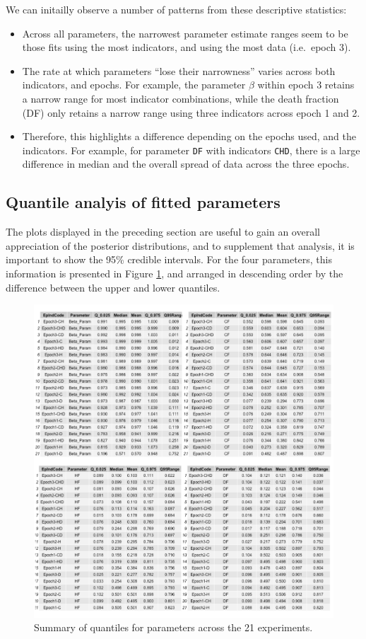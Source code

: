 \documentclass[10pt,letterpaper]{article}
\begin{document}
We can initailly observe a number of patterns from these descriptive statistics:

\begin{itemize}
\item
  Across all parameters, the narrowest parameter estimate ranges seem to be those fits using the most indicators, and using the most data (i.e.~epoch 3).
\item
  The rate at which parameters ``lose their narrowness'' varies across both indicators, and epochs. For example, the parameter \(\beta\) within epoch 3 retains a narrow range for most indicator combinations, while the death fraction (DF) only retains a narrow range using three indicators across epoch 1 and 2.
\item
  Therefore, this highlights a difference depending on the epochs used, and the indicators. For example, for parameter \texttt{DF} with indicators \texttt{CHD}, there is a large difference in median and the overall spread of data across the three epochs.
\end{itemize}

\hypertarget{quantile-analyis-of-fitted-parameters}{%
\subsection{Quantile analyis of fitted parameters}\label{quantile-analyis-of-fitted-parameters}}

The plots displayed in the preceding section are useful to gain an overall appreciation of the posterior distributions, and to supplement that analysis, it is important to show the 95\% credible intervals. For the four parameters, this information is presented in Figure \ref{fig:exp-quants}, and arranged in descending order by the difference between the upper and lower quantiles.

\begin{figure}
\includegraphics[width=0.9\linewidth]{diagrams/exp_quants} \caption{Summary of quantiles for parameters across the 21 experiments.}\label{fig:exp-quants}
\end{figure}
\end{document}
